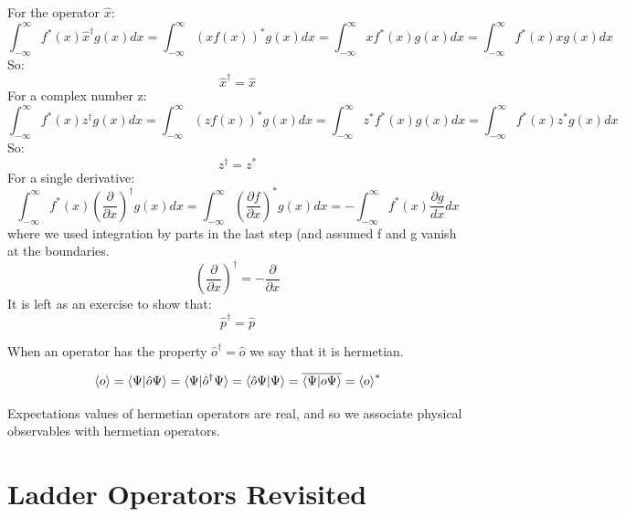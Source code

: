 \documentclass[12pt]{book}
\begin{document}
For the operator $\hat{x}$:
\begin{equation*}
\int_{-\infty}^{\infty} f^*(x)\hat{x}^\dagger g(x) dx = 
\int_{-\infty}^{\infty} \left(x f(x)\right)^* g(x) dx = 
\int_{-\infty}^{\infty} x f^*(x) g(x) dx = 
\int_{-\infty}^{\infty} f^*(x) x g(x) dx 
\end{equation*}
So:
\begin{equation}
\hat{x}^\dagger = \hat{x}
\end{equation}
For a complex number z:
\begin{equation*}
\int_{-\infty}^{\infty} f^*(x)z^\dagger g(x) dx = 
\int_{-\infty}^{\infty} \left(z f(x)\right)^* g(x) dx = 
\int_{-\infty}^{\infty} z^* f^*(x) g(x) dx = 
\int_{-\infty}^{\infty} f^*(x) z^* g(x) dx 
\end{equation*}
So:
\begin{equation}
z^\dagger = z^*
\end{equation}
For a single derivative:
\begin{equation*}
\int_{-\infty}^{\infty} f^*(x) \left( \frac{\partial}{\partial x} \right)^\dagger g(x) dx = 
\int_{-\infty}^{\infty} \left(\frac{\partial f}{\partial x}\right)^* g(x) dx = 
-\int_{-\infty}^{\infty} f^*(x) \frac{\partial g}{dx} dx  
\end{equation*}
where we used integration by parts in the last step (and assumed f and g vanish at the boundaries.
\begin{equation}
\left( \frac{\partial}{\partial x} \right)^{\dagger} = -\frac{\partial}{\partial x}
\end{equation}
It is left as an exercise to show that:
\begin{equation}
\hat{p}^\dagger = \hat{p}
\end{equation}

When an operator has the property $\hat{o}^\dagger = \hat{o}$ we say that it is hermetian.  

\begin{equation}
\braket{o} = \braket{\Psi|\hat{o}\Psi} = \braket{\Psi|\hat{o}^\dagger \Psi}
= \braket{\hat{o} \Psi| \Psi} = \overline{\braket{\Psi| o \Psi}} = \braket{o}^*
\end{equation}

Expectations values of hermetian operators are real, and so we associate physical observables with hermetian operators. 







\section{Ladder Operators Revisited}
\end{document}
